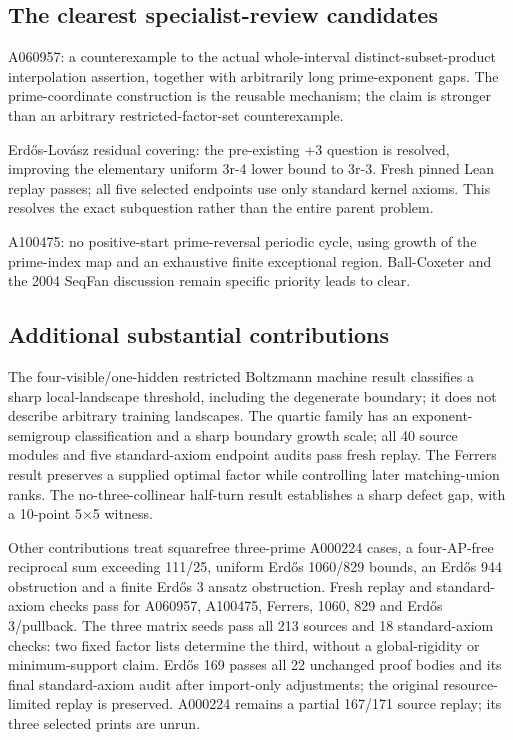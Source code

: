 \documentclass[10pt,a4paper]{article}
\begin{document}
\subsection{The clearest specialist-review candidates}
A060957: a counterexample to the actual whole-interval distinct-subset-product interpolation assertion, together with arbitrarily long prime-exponent gaps. The prime-coordinate construction is the reusable mechanism; the claim is stronger than an arbitrary restricted-factor-set counterexample.

Erdős-Lovász residual covering: the pre-existing +3 question is resolved, improving the elementary uniform 3r-4 lower bound to 3r-3. Fresh pinned Lean replay passes; all five selected endpoints use only standard kernel axioms. This resolves the exact subquestion rather than the entire parent problem.

A100475: no positive-start prime-reversal periodic cycle, using growth of the prime-index map and an exhaustive finite exceptional region. Ball-Coxeter and the 2004 SeqFan discussion remain specific priority leads to clear.

\subsection{Additional substantial contributions}
The four-visible/one-hidden restricted Boltzmann machine result classifies a sharp local-landscape threshold, including the degenerate boundary; it does not describe arbitrary training landscapes. The quartic family has an exponent-semigroup classification and a sharp boundary growth scale; all 40 source modules and five standard-axiom endpoint audits pass fresh replay. The Ferrers result preserves a supplied optimal factor while controlling later matching-union ranks. The no-three-collinear half-turn result establishes a sharp defect gap, with a 10-point 5\ensuremath{\times}5 witness.

Other contributions treat squarefree three-prime A000224 cases, a four-AP-free reciprocal sum exceeding 111/25, uniform Erdős 1060/829 bounds, an Erdős 944 obstruction and a finite Erdős 3 ansatz obstruction. Fresh replay and standard-axiom checks pass for A060957, A100475, Ferrers, 1060, 829 and Erdős 3/pullback. The three matrix seeds pass all 213 sources and 18 standard-axiom checks: two fixed factor lists determine the third, without a global-rigidity or minimum-support claim. Erdős 169 passes all 22 unchanged proof bodies and its final standard-axiom audit after import-only adjustments; the original resource-limited replay is preserved. A000224 remains a partial 167/171 source replay; its three selected prints are unrun.
\end{document}
